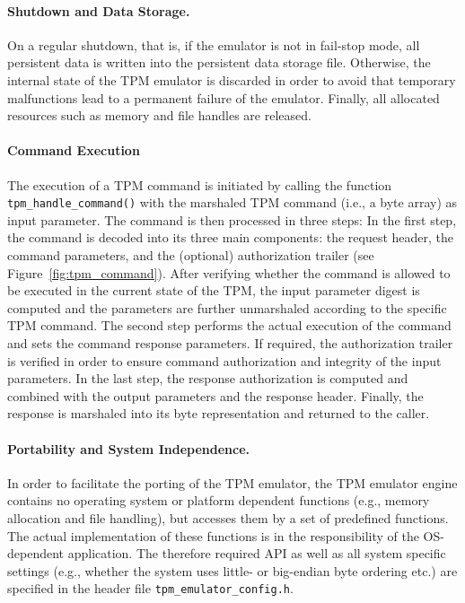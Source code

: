 \documentclass[runningheads]{llncs}
\newcommand{\file}[1]{\small\texttt{#1}\normalsize}
\newcommand{\func}[1]{\small\texttt{#1}\normalsize}
\begin{document}
\paragraph{Shutdown and Data Storage.}
On a regular shutdown, that is, if the emulator is not in fail-stop mode, all
persistent data is written into the persistent data storage file. Otherwise,
the internal state of the TPM emulator is discarded in order to avoid that
temporary malfunctions lead to a permanent failure of the emulator. Finally,
all allocated resources such as memory and file handles are released.

\paragraph{Command Execution}
The execution of a TPM command is initiated by calling the function
\func{tpm\_\-handle\_\-command()} with the marshaled TPM command (i.e., a
byte array) as input parameter. The command is then processed in three steps:
In the first step, the command is decoded into its three main components: the
request header, the command parameters, and the (optional) authorization
trailer (see Figure~\ref{fig:tpm_command}). After verifying whether the command
is allowed to be executed in the current state of the TPM, the input parameter
digest is computed and the parameters are further unmarshaled according to the
specific TPM command. The second step performs the actual execution of the
command and sets the command response parameters. If required, the
authorization trailer is verified in order to ensure command authorization
and integrity of the input parameters. In the last step, the response
authorization is computed and combined with the output parameters and the
response header. Finally, the response is marshaled into its byte
representation and returned to the caller.

\paragraph{Portability and System Independence.}
In order to facilitate the porting of the TPM emulator, the TPM emulator
engine contains no operating system or platform dependent functions (e.g.,
memory allocation and file handling), but accesses them by a set of predefined
functions. The actual implementation of these functions is in the
responsibility of the OS-dependent application. The therefore required API
as well as all system specific settings (e.g., whether the system uses
little- or big-endian byte ordering etc.) are specified in the header file
\file{tpm\_emulator\_config.h}.
\end{document}
